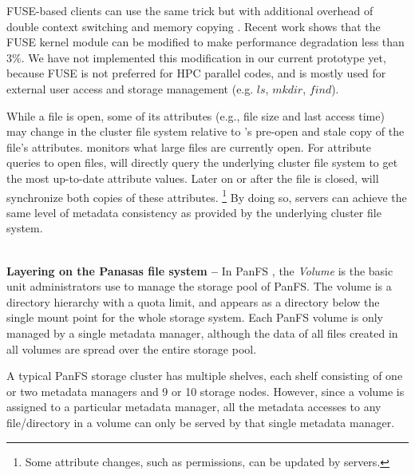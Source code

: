FUSE-based clients can use the same trick but with additional overhead
of double context switching and memory copying \cite{PLFS}.
Recent work \cite{fuseopt} shows that the FUSE kernel module can be modified
to make performance degradation less than $3\%$. We have not implemented
this modification in our current prototype yet, because FUSE is not preferred
for HPC parallel codes, and is mostly used for external user access
and storage management (e.g. $ls$, $mkdir$, $find$).

While a file is open, some of its attributes (e.g., file size and last access time)
may change in the cluster file system relative to
\tfs's pre-open and stale copy of the file's attributes.
\sys monitors what large files are currently open.
For attribute queries to open files, \sys will directly query the underlying
cluster file system to get the most up-to-date attribute values.
Later on or after the file is closed,
\sys will synchronize both copies of these attributes.
\footnote{Some attribute changes, such as permissions, can be updated by \sys servers.}
By doing so, \sys servers can achieve the same level of metadata consistency
as provided by the underlying cluster file system.

~\\
\textbf{Layering on the Panasas file system -- }
In PanFS \cite{PanFS}, the \textit{Volume} is the basic unit
administrators use to manage the storage pool of PanFS.
The volume is a directory hierarchy with a quota limit, and appears
as a directory below the single mount point for the whole storage system.
Each PanFS volume is only managed by a single metadata manager, although
the data of all files created in all volumes are spread over the entire storage pool.

A typical PanFS storage cluster has multiple shelves,
each shelf consisting of one or two metadata managers and 9 or 10 storage nodes.
However, since a volume is assigned to a particular metadata manager,
all the metadata accesses to any file/directory in a volume
can only be served by that single metadata manager.


